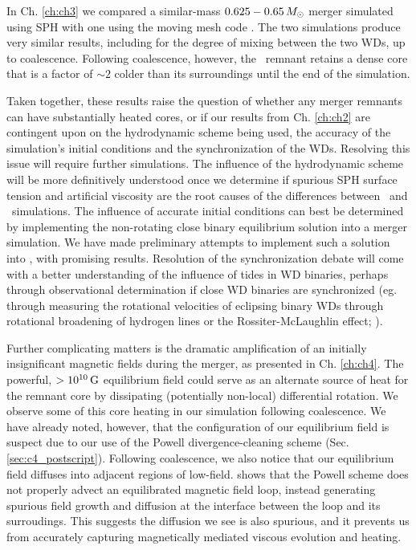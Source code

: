 In Ch. \ref{ch:ch3} we compared a similar-mass $0.625-0.65\,\Msun$ merger simulated using SPH with one using the moving mesh code \arepo.  The two simulations produce very similar results, including for the degree of mixing between the two WDs, up to coalescence.  Following coalescence, however, the \arepo\ remnant retains a dense core that is a factor of $\sim2$ colder than its surroundings until the end of the simulation.


Taken together, these results raise the question of whether any merger remnants can have substantially heated cores, or if our results from Ch. \ref{ch:ch2} are contingent upon on the hydrodynamic scheme being used, the accuracy of the simulation's initial conditions and the synchronization of the WDs.  Resolving this issue will require further simulations.  The influence of the hydrodynamic scheme will be more definitively understood once we determine if spurious SPH surface tension and artificial viscosity are the root causes of the differences between \gasoline\ and \arepo\ simulations.  The influence of accurate initial conditions can best be determined by implementing the non-rotating close binary equilibrium solution \citep{uryue98} into a merger simulation.  We have made preliminary attempts to implement such a solution into \gasoline, with promising results.  Resolution of the synchronization debate will come with a better understanding of the influence of tides in WD binaries, perhaps through observational determination if close WD binaries are synchronized (eg. through measuring the rotational velocities of eclipsing binary WDs through rotational broadening of hydrogen lines or the Rossiter-McLaughlin effect; \citealt{piro11}).

Further complicating matters is the dramatic amplification of an initially insignificant magnetic fields during the merger, as presented in Ch. \ref{ch:ch4}.  The powerful, $>10^{10}\,\mathrm{G}$ equilibrium field could serve as an alternate source of heat for the remnant core by dissipating (potentially non-local) differential rotation.  We observe some of this core heating in our simulation following coalescence.  We have already noted, however, that the configuration of our equilibrium field is suspect due to our use of the Powell divergence-cleaning scheme (Sec. \ref{sec:c4_postscript}).  Following coalescence, we also notice that our equilibrium field diffuses into adjacent regions of low-field.  \citep{hopkr16} shows that the Powell scheme does not properly advect an equilibrated magnetic field loop, instead generating spurious field growth and diffusion at the interface between the loop and its surroudings.  This suggests the diffusion we see is also spurious, and it prevents us from accurately capturing magnetically mediated viscous evolution and heating.

